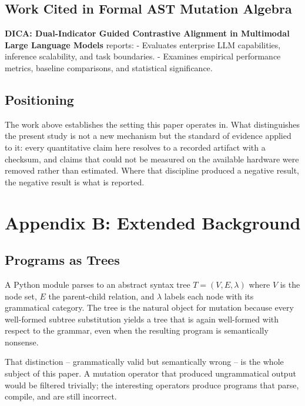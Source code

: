 \documentclass[10pt,journal,compsoc,twocolumn]{IEEEtran}
\begin{document}
\subsection{Work Cited in Formal AST Mutation Algebra}


\textbf{DICA: Dual-Indicator Guided Contrastive Alignment in Multimodal Large Language Models} \cite{crossref_10_18653_v1_2026_findings_acl_1933} reports: - Evaluates enterprise LLM capabilities, inference scalability, and task boundaries. - Examines empirical performance metrics, baseline comparisons, and statistical significance.


\subsection{Positioning}


The work above establishes the setting this paper operates in. What distinguishes the present study is not a new mechanism but the standard of evidence applied to it: every quantitative claim here resolves to a recorded artifact with a checksum, and claims that could not be measured on the available hardware were removed rather than estimated. Where that discipline produced a negative result, the negative result is what is reported.




\section{Appendix B: Extended Background}



\subsection{Programs as Trees}


A Python module parses to an abstract syntax tree $T = (V, E, \lambda)$ where $V$ is the node set, $E$ the parent-child relation, and $\lambda$ labels each node with its grammatical category. The tree is the natural object for mutation because every well-formed subtree substitution yields a tree that is again well-formed with respect to the grammar, even when the resulting program is semantically nonsense.

That distinction -- grammatically valid but semantically wrong -- is the whole subject of this paper. A mutation operator that produced ungrammatical output would be filtered trivially; the interesting operators produce programs that parse, compile, and are still incorrect.
\end{document}
